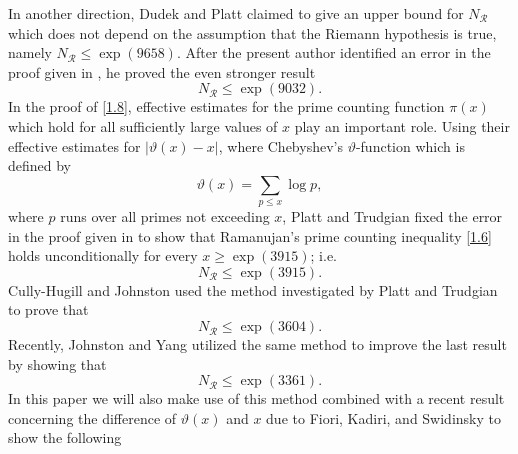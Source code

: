 \documentclass[a4paper,12pt]{amsart}
\theoremstyle{definition}
\theoremstyle{remark}
\begin{document}
In another direction, Dudek and Platt \cite[Theorem 1.2]{dudekplatt} claimed to give an upper bound for $N_{\mathcal{R}}$ which does not depend on the assumption that the Riemann hypothesis is true, namely $N_{\mathcal{R}} \leq \exp(9658)$.
After the present author identified an error in the proof given in \cite[Theorem 1.2]{dudekplatt}, he proved \cite[Theorem 4]{axler} the even stronger result
\begin{equation}
N_{\mathcal{R}} \leq \exp(9032). \tag{1.8} \label{1.8}
\end{equation}
In the proof of \eqref{1.8}, effective estimates for the prime counting function $\pi(x)$ which hold for all sufficiently large values of $x$ play an important role. Using their effective estimates for $|\vartheta(x)-x|$, where Chebyshev's $\vartheta$-function which is defined by
\begin{equation}
\vartheta(x) = \sum_{p \leq x} \log p, \tag{1.9} \label{1.9}
\end{equation}
where $p$ runs over all primes not exceeding $x$, Platt and Trudgian \cite[Theorem 2]{plattt} fixed the error in the proof given in \cite[Theorem 1.2]{dudekplatt} to show that Ramanujan's prime counting inequality \eqref{1.6} holds unconditionally for every $x \geq \exp(3915)$; i.e. 
\begin{equation}
N_{\mathcal{R}} \leq \exp(3915).  \tag{1.10} \label{1.10}
\end{equation}
Cully-Hugill and Johnston \cite[Corollary 1.6]{cully} used the method investigated by Platt and Trudgian to prove that
\begin{equation}
N_{\mathcal{R}} \leq \exp(3604).  \tag{1.11} \label{1.11}
\end{equation}
Recently, Johnston and Yang \cite[Theorem 1.5]{yang} utilized the same method to improve the last result by showing that
\begin{equation}
N_{\mathcal{R}} \leq \exp(3361).  \tag{1.12} \label{1.12}
\end{equation}
In this paper we will also make use of this method combined with a recent result concerning the difference of $\vartheta(x)$ and $x$ due to Fiori, Kadiri, and Swidinsky \cite{kadiri} to show the following
\end{document}
